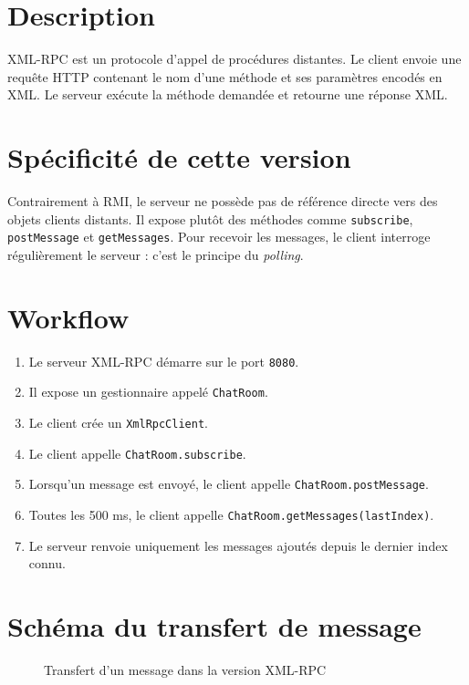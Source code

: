 \documentclass[12pt,a4paper]{report}
\begin{document}
\section{Description}

XML-RPC est un protocole d'appel de procédures distantes. Le client envoie une requête HTTP contenant le nom d'une méthode et ses paramètres encodés en XML. Le serveur exécute la méthode demandée et retourne une réponse XML.

\section{Spécificité de cette version}

Contrairement à RMI, le serveur ne possède pas de référence directe vers des objets clients distants. Il expose plutôt des méthodes comme \texttt{subscribe}, \texttt{postMessage} et \texttt{getMessages}. Pour recevoir les messages, le client interroge régulièrement le serveur : c'est le principe du \textit{polling}.

\section{Workflow}

\begin{enumerate}
    \item Le serveur XML-RPC démarre sur le port \texttt{8080}.
    \item Il expose un gestionnaire appelé \texttt{ChatRoom}.
    \item Le client crée un \texttt{XmlRpcClient}.
    \item Le client appelle \texttt{ChatRoom.subscribe}.
    \item Lorsqu'un message est envoyé, le client appelle \texttt{ChatRoom.postMessage}.
    \item Toutes les 500 ms, le client appelle \texttt{ChatRoom.getMessages(lastIndex)}.
    \item Le serveur renvoie uniquement les messages ajoutés depuis le dernier index connu.
\end{enumerate}

\section{Schéma du transfert de message}

\begin{figure}[H]
\centering
{}
\caption{Transfert d'un message dans la version XML-RPC}
\end{figure}
\end{document}
